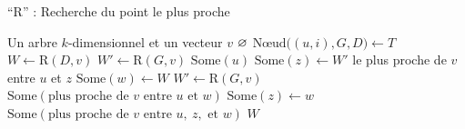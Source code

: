 \begin{algorithm}[H]
	\centering
	\caption{``R'' : Recherche du point le plus proche}
	\begin{algorithmic}[1]
		\Entree Un arbre $k$-dimensionnel et un vecteur $v$\/
			\State\Return $\varnothing$\/
		\Else
			\State $\text{Nœud}\big((u,i), G, D\big) \gets T$
				\State $W \gets \text{R}(D, v)$\/
					\State $W' \gets \text{R}(G, v)$\/ 
						\State\Return $\text{Some}(u)$\/ 
					\Else
						\State $\text{Some}(z) \gets W'$\/
						\State \Return le plus proche de $v$\/ entre $u$\/ et $z$\/
					\EndIf
				\Else
					\State $\text{Some}(w) \gets W$\/ 
					 
						\State $W' \gets \text{R}(G, v)$\/ 
							\State\Return $\text{Some}(\text{plus proche de } v \text{ entre } u \text{ et } w)$\/ 
						\Else
							\State $\text{Some}(z) \gets w$\/
							\State\Return $\text{Some}(\text{plus proche de } v \text{ entre } u,\ z, \text{ et } w)$\/
						\EndIf
					\Else\State\Return $W$\/
					\EndIf
				\EndIf
			\EndIf
		\EndIf
	\end{algorithmic}
\end{algorithm}


